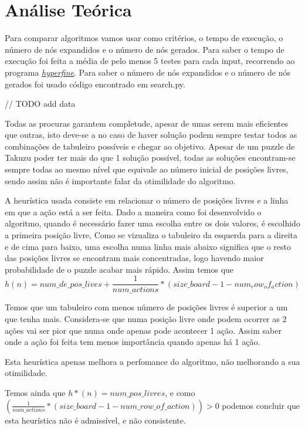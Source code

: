 \documentclass[12pt,a4paper]{article}
\begin{document}
  \section{Análise Teórica}

  Para comparar algoritmos vamos usar como critérios, o tempo de execução, o número de nós expandidos e o número de nós gerados.
  Para saber o tempo de execução foi feita a média de pelo menos 5 testes para cada input, recorrendo ao programa \href{https://github.com/sharkdp/hyperfine}{\textit{hyperfine}}.
  Para saber o número de nós expandidos e o número de nós gerados foi usado código encontrado em search.py.

  // TODO add data

  
  Todas as procuras garantem completude, apesar de umas serem mais eficientes que outras, isto deve-se a no caso de haver solução podem sempre testar todos as combinações de tabuleiro possíveis e chegar ao objetivo.
  Apesar de um puzzle de Takuzu poder ter mais do que 1 solução possível, todas as soluções encontram-se sempre todas ao mesmo nível que equivale ao número inicial de posições livres, sendo assim não é importante falar da otimilidade do algoritmo.
  
  A heurística usada consiste em relacionar o número de posições livres e a linha em que a ação está a ser feita.
  Dado a maneira como foi desenvolvido o algoritmo, quando é necessário fazer uma escolha entre os dois valores, é escolhido a primeira
  posição livre,
  Como se vizualiza o tabuleiro da esquerda para a direita e de cima para baixo, uma escolha numa linha mais abaixo significa que o resto das posições livres se encontram mais concentradas, logo havendo maior probabilidade de o puzzle acabar mais rápido.
  Assim temos que
  $$
  h(n) = {num\_de\_pos\_lives} + \frac{1}{num\_actions} * (size\_board - 1 - num_row_of_action)
  $$

  Temos que um tabuleiro com menos número de posições livres é superior a um que tenha mais.
  Considera-se que numa posição livre onde podem ocorrer as 2 ações vai ser pior que numa onde apenas pode acontecer 1 ação.
  Assim saber onde a ação foi feita tem menos importância quando apenas há 1 ação. 
  
  Esta heurística apenas melhora a perfomance do algoritmo, não melhorando a sua otimilidade. 

  Temos ainda que $h*(n) = num\_pos\_livres$, e como $(\frac{1}{num\_actions} * (size\_board - 1 - num\_row\_of\_action)) > 0$ podemos concluir que esta heurística não é admissível, e não consistente.
\end{document}
